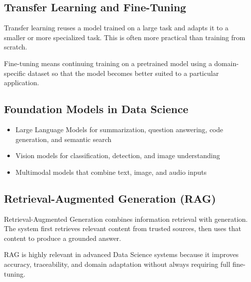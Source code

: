 \documentclass[11pt,a4paper]{article}
\begin{document}
\subsection{Transfer Learning and Fine-Tuning}

\begin{definitionbox}
Transfer learning reuses a model trained on a large task and adapts it to a smaller or more specialized task. This is often more practical than training from scratch.
\end{definitionbox}

\begin{definitionbox}
Fine-tuning means continuing training on a pretrained model using a domain-specific dataset so that the model becomes better suited to a particular application.
\end{definitionbox}

\subsection{Foundation Models in Data Science}

\begin{itemize}[leftmargin=*]
  \item Large Language Models for summarization, question answering, code generation, and semantic search
  \item Vision models for classification, detection, and image understanding
  \item Multimodal models that combine text, image, and audio inputs
\end{itemize}

\subsection{Retrieval-Augmented Generation (RAG)}

\begin{definitionbox}[RAG]
Retrieval-Augmented Generation combines information retrieval with generation. The system first retrieves relevant content from trusted sources, then uses that content to produce a grounded answer.
\end{definitionbox}

\begin{conceptbox}
RAG is highly relevant in advanced Data Science systems because it improves accuracy, traceability, and domain adaptation without always requiring full fine-tuning.
\end{conceptbox}
\end{document}
